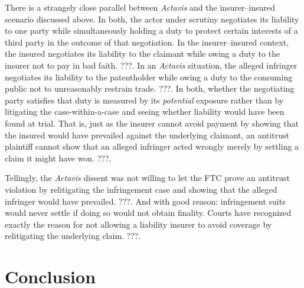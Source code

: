 \documentclass[
  12pt,
  letterpaper,
]{scrartcl}
\begin{document}
There is a strangely close parallel between \textit{Actavis} and the
insurer--insured scenario discussed above. In both, the actor under scrutiny
negotiates its liability to one party while simultaneously holding a duty to
protect certain interests of a third party in the outcome of that negotiation.
In the insurer--insured context, the insured negotiates its liability to the
claimant while owing a duty to the insurer not to pay in bad faith. ???. In an
\emph{Actavis} situation, the alleged infringer negotiates its liability to the
patentholder while owing a duty to the consuming public not to unreasonably
restrain trade. ???. In both, whether the negotiating party satisfies that duty
is measured by its \emph{potential} exposure rather than by litigating the
case-within-a-case and seeing whether liability would have been found at trial.
That is, just as the insurer cannot avoid payment by showing that the insured
would have prevailed against the underlying claimant, an antitrust plaintiff
cannot show that an alleged infringer acted wrongly merely by settling a claim
it might have won. ???.

Tellingly, the \textit{Actavis} dissent was not willing to let the FTC prove an
antitrust violation by relitigating the infringement case and showing that the
alleged infringer would have prevailed. ???. And with good reason: infringement
suits would never settle if doing so would not obtain finality. Courts have
recognized exactly the reason for not allowing a liability insurer to avoid
coverage by relitigating the underlying claim. ???.


\section{Conclusion}
\end{document}

